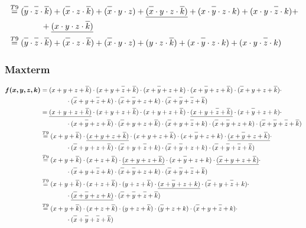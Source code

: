 \documentclass{article}
\newcommand*{\oline}[1]{\overline{#1\mathstrut}}
\newcommand{\bigspace}{\quad\quad\quad\quad}
\begin{document}
\begin{align*}
  &\overset{T9}{=} (\oline{y} \cdot \oline{z} \cdot \oline{k}) + (\oline{x} \cdot z \cdot \oline{k}) + (\oline{x} \cdot y \cdot z) + \underline{(\oline{x} \cdot y \cdot z \cdot \oline{k})} + (x \cdot \oline{y} \cdot z \cdot k) + (x \cdot y \cdot \oline{z} \cdot k) + \\
  &\bigspace + \underline{(x \cdot y \cdot z \cdot \oline{k})}\\
  &\overset{T9}{=} (\oline{y} \cdot \oline{z} \cdot \oline{k}) + (\oline{x} \cdot z \cdot \oline{k}) + (\oline{x} \cdot y \cdot z) + (y \cdot z \cdot \oline{k}) + (x \cdot \oline{y} \cdot z \cdot k) + (x \cdot y \cdot \oline{z} \cdot k)
\end{align*}

\subsubsection*{Maxterm}
\begin{align*}
  \bm{f(x,y,z,k)} &= (x+y+z+\oline{k}) \cdot (x+y+\oline{z}+\oline{k}) \cdot (x+\oline{y}+z+k) \cdot (x+\oline{y}+z+\oline{k}) \cdot (\oline{x}+y+z+\oline{k}) \cdot \\
  &\bigspace \cdot (\oline{x}+y+\oline{z}+k) \cdot (\oline{x}+\oline{y}+z+k) \cdot (\oline{x}+\oline{y}+\oline{z}+\oline{k})\\
  &= \underline{(x+y+z+\oline{k})} \cdot (x+y+z+\oline{k}) \cdot (x+y+z+\oline{k}) \cdot \underline{(x+y+\oline{z}+\oline{k})} \cdot (x+\oline{y}+z+k) \cdot \\
  &\bigspace \cdot (x+\oline{y}+z+\oline{k}) \cdot (\oline{x}+y+z+\oline{k}) \cdot (\oline{x}+y+\oline{z}+k) \cdot (\oline{x}+\oline{y}+z+k) \cdot (\oline{x}+\oline{y}+\oline{z}+\oline{k})\\
  &\overset{T9}{=} (x+y+\oline{k}) \cdot \underline{(x+y+z+\oline{k})} \cdot (x+y+z+\oline{k}) \cdot (x+\oline{y}+z+k) \cdot \underline{(x+\oline{y}+z+\oline{k})} \cdot \\
  &\bigspace \cdot (\oline{x}+y+z+\oline{k}) \cdot (\oline{x}+y+\oline{z}+k) \cdot (\oline{x}+\oline{y}+z+k) \cdot (\oline{x}+\oline{y}+\oline{z}+\oline{k})\\
  &\overset{T9}{=} (x+y+\oline{k}) \cdot (x+z+\oline{k}) \cdot \underline{(x+y+z+\oline{k})} \cdot (x+\oline{y}+z+k) \cdot \underline{(\oline{x}+y+z+\oline{k})} \cdot\\
  &\bigspace \cdot (\oline{x}+y+\oline{z}+k) \cdot (\oline{x}+\oline{y}+z+k) \cdot (\oline{x}+\oline{y}+\oline{z}+\oline{k})\\
  &\overset{T9}{=} (x+y+\oline{k}) \cdot (x+z+\oline{k}) \cdot (y+z+\oline{k}) \cdot \underline{(x+\oline{y}+z+k)} \cdot (\oline{x}+y+\oline{z}+k) \cdot\\
  &\bigspace \cdot \underline{(\oline{x}+\oline{y}+z+k)} \cdot (\oline{x}+\oline{y}+\oline{z}+\oline{k})\\
  &\overset{T9}{=} (x+y+\oline{k}) \cdot (x+z+\oline{k}) \cdot (y+z+\oline{k}) \cdot (\oline{y}+z+k) \cdot (\oline{x}+y+\oline{z}+k) \cdot\\
  &\bigspace \cdot (\oline{x}+\oline{y}+\oline{z}+\oline{k})
\end{align*}
\end{document}
